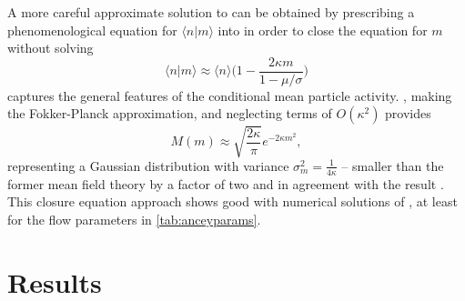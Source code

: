 A more careful approximate solution to \DIFdelbegin {}\DIFdelend \DIFaddbegin {}\DIFaddend can be obtained by prescribing a phenomenological equation for $\langle n | m \rangle$ into \DIFdelbegin {}\DIFdelend \DIFaddbegin {}\DIFaddend in order to close the equation for $m$ without solving \DIFdelbegin {}\DIFdelend \DIFaddbegin {}\DIFaddend \begin{equation}
	\langle n | m  \rangle \approx \langle n \rangle \Big( 1 - \frac{2\kappa m}{1-\mu/\sigma}\Big) \label{eq:closure}
\end{equation}
captures the general features of the conditional mean particle activity.
\DIFdelbegin {}\DIFdelend \DIFaddbegin {}\DIFaddend , making the Fokker-Planck approximation, and neglecting terms of $O(\kappa^2)$ provides 
\DIFdelbegin %
\DIFdelend \DIFaddbegin \begin{equation} M(m) \approx \sqrt{\frac{2\kappa}{\pi}} e^{-2\kappa m^2}, \label{eq:ou2}\end{equation}\DIFaddend 
representing a Gaussian distribution with variance $\sigma_m^2 = \frac{1}{4\kappa}$ -- smaller than the former mean field theory by a factor of two and in agreement with the result \DIFdelbegin {}\DIFdelend \DIFaddbegin {}\DIFaddend .
This closure equation approach shows good \DIFdelbegin {}\DIFdelend \DIFaddbegin {}\DIFaddend with numerical solutions of \DIFdelbegin {}\DIFdelend \DIFaddbegin {}\DIFaddend , at least for the flow parameters in \DIFdelbegin {}\DIFdelend \DIFaddbegin {}\DIFaddend \ref{tab:anceyparams}.

\section{Results}
\label{sec:eleresults}


